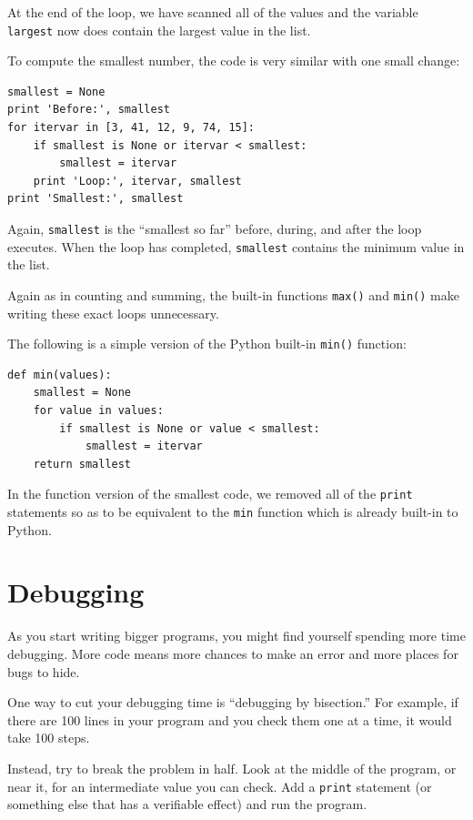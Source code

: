 \documentclass[10pt]{book}
\begin{document}
At the end of the loop, we have scanned all of the values and
the variable {\tt largest} now does contain the largest value
in the list.

To compute the smallest number, the code is very similar with one
small change:

\beforeverb
\begin{verbatim}
smallest = None
print 'Before:', smallest
for itervar in [3, 41, 12, 9, 74, 15]:
    if smallest is None or itervar < smallest:
        smallest = itervar
    print 'Loop:', itervar, smallest
print 'Smallest:', smallest
\end{verbatim}
\afterverb
%
Again, {\tt smallest} is the ``smallest so far'' before, during, and after the 
loop executes.  When the loop has completed, {\tt smallest} contains the
minimum value in the list.

Again as in counting and summing, the built-in functions 
{\tt max()} and {\tt min()} make writing these exact loops
unnecessary.

The following is a simple version of the Python built-in
{\tt min()} function:

\beforeverb
\begin{verbatim}
def min(values):
    smallest = None
    for value in values:
        if smallest is None or value < smallest:
            smallest = itervar
    return smallest
\end{verbatim}
\afterverb
%
In the function version of the smallest code, we removed all of the 
{\tt print} statements so as to be equivalent to the {\tt min} 
function which is already built-in to Python.

\section{Debugging}

As you start writing bigger programs, you might find yourself
spending more time debugging.  More code means more chances to
make an error and more places for bugs to hide.


One way to cut your debugging time is ``debugging by bisection.''
For example, if there are 100 lines in your program and you
check them one at a time, it would take 100 steps.

Instead, try to break the problem in half.  Look at the middle
of the program, or near it, for an intermediate value you
can check.  Add a {\tt print} statement (or something else
that has a verifiable effect) and run the program.
\end{document}
